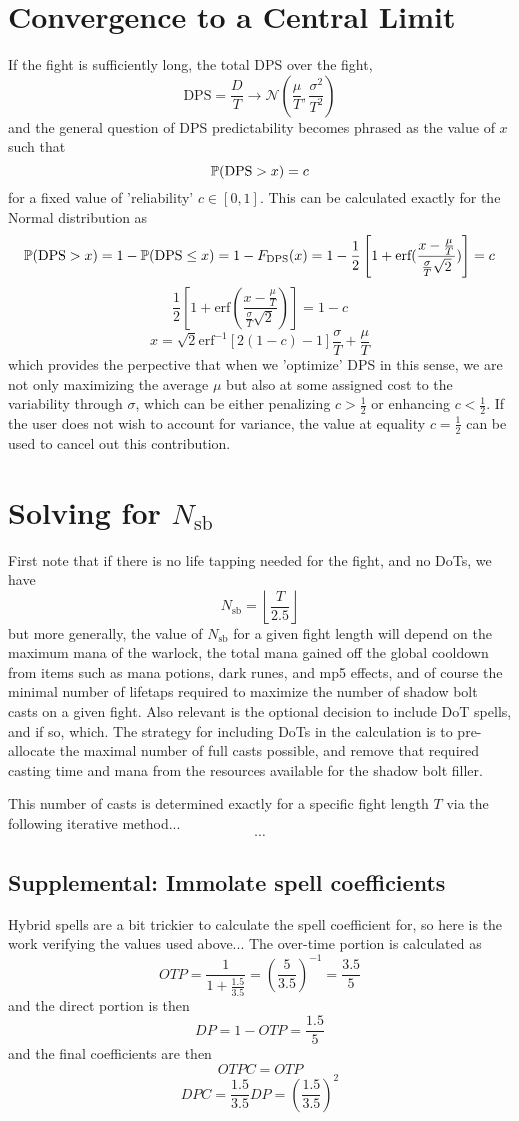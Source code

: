 \section*{Convergence to a Central Limit}
%
If the fight is sufficiently long, the total DPS over the fight,
%
$$
\text{DPS} = \frac{D}{T}
\rightarrow \mathcal{N}(\frac{\mu}{T}, \frac{\sigma^2}{T^2})
$$
%
and the general question of DPS predictability becomes phrased as the value of $x$ such that
%
$$
\P(\text{DPS} > x) = c
$$
%
for a fixed value of 'reliability' $c \in [0,1]$. This can be calculated exactly for the Normal distribution as
%
$$
\P(\text{DPS} > x) = 1 - \P(\text{DPS} \leq x)
= 1 - F_\text{DPS}(x)
= 1 - \frac{1}{2} \left[ 1 + \text{erf}(\frac{ x - \frac{\mu}{T} }{ \frac{\sigma}{T} \sqrt{2} }) \right] = c
$$
%
$$
\frac{1}{2} \left[ 1 + \text{erf}(\frac{ x - \frac{\mu}{T} }{ \frac{\sigma}{T} \sqrt{2} }) \right] = 1 - c
$$
$$
x = \sqrt{2} \text{erf}^{-1} \left[ 2 (1 - c) - 1 \right] \frac{\sigma}{T} + \frac{\mu}{T}
$$
%
which provides the perpective that when we 'optimize' DPS in this sense, we are not only maximizing the average $\mu$ but also at some assigned cost to the variability through $\sigma$, which can be either penalizing $c > \frac{1}{2}$ or enhancing $c < \frac{1}{2}$. If the user does not wish to account for variance, the value at equality $c = \frac{1}{2}$ can be used to cancel out this contribution.



\section*{Solving for $N_\text{sb}$}
%
First note that if there is no life tapping needed for the fight, and no DoTs, we have
%
$$
N_\text{sb} = \left\lfloor \frac{T}{2.5} \right\rfloor
$$
%
but more generally, the value of $N_\text{sb}$ for a given fight length will depend on the maximum mana of the warlock, the total mana gained off the global cooldown from items such as mana potions, dark runes, and mp5 effects, and of course the minimal number of lifetaps required to maximize the number of shadow bolt casts on a given fight. Also relevant is the optional decision to include DoT spells, and if so, which. The strategy for including DoTs in the calculation is to pre-allocate the maximal number of full casts possible, and remove that required casting time and mana from the resources available for the shadow bolt filler.

This number of casts is determined exactly for a specific fight length $T$ via the following iterative method...
%
$$
\cdots
$$



\subsection*{Supplemental: Immolate spell coefficients}
%
Hybrid spells are a bit trickier to calculate the spell coefficient for, so here is the work verifying the values used above... The over-time portion is calculated as
%
$$
OTP = \frac{1}{1 + \frac{1.5}{3.5}}
= (\frac{5}{3.5})^{-1}
= \frac{3.5}{5}
$$
%
and the direct portion is then
%
$$
DP = 1 - OTP = \frac{1.5}{5}
$$
%
and the final coefficients are then
%
$$
OTPC = OTP
$$
$$
DPC = \frac{1.5}{3.5} DP
= (\frac{1.5}{3.5})^2
$$